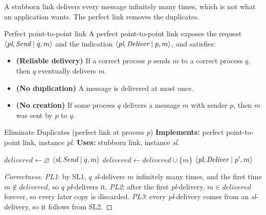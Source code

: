 A stubborn link delivers every message infinitely many times, which is not what an application wants. The perfect link removes the duplicates.

\begin{frameddefn}[label={def:perfect-link}]{Perfect point-to-point link}
  A perfect point-to-point link exposes the request $\left\langle \textit{pl}, \textit{Send} \mid q, m \right\rangle$ and the indication $\left\langle \textit{pl}, \textit{Deliver} \mid p, m \right\rangle$, and satisfies:
  \begin{itemize}[leftmargin=3.4em]
    \item[\textbf{PL1}] \textbf{(Reliable delivery)} If a correct process $p$ sends $m$ to a correct process $q$, then $q$ eventually delivers $m$.
    \item[\textbf{PL2}] \textbf{(No duplication)} A message is delivered at most once.
    \item[\textbf{PL3}] \textbf{(No creation)} If some process $q$ delivers a message $m$ with sender $p$, then $m$ was sent by $p$ to $q$.
  \end{itemize}
\end{frameddefn}

\begin{framedalgo}[label={alg:eliminate-duplicates}, unbreakable]{Eliminate Duplicates (perfect link at process $p$)}
  \textbf{Implements:} perfect point-to-point link, instance \textit{pl}. \quad \textbf{Uses:} stubborn link, instance \textit{sl}.
  \begin{algorithmic}[1]
      \State $\textit{delivered} \gets \varnothing$
    \EndUpon
      \State \Trigger $\left\langle \textit{sl}, \textit{Send} \mid q, m \right\rangle$
    \EndUpon
        \State $\textit{delivered} \gets \textit{delivered} \cup \{m\}$
        \State \Trigger $\left\langle \textit{pl}, \textit{Deliver} \mid p', m \right\rangle$
      \EndIf
    \EndUpon
  \end{algorithmic}
\end{framedalgo}

\begin{proof}[Correctness]
  \textit{PL1}: by SL1, $q$ \textit{sl}-delivers $m$ infinitely many times, and the first time $m \notin \textit{delivered}$, so $q$ \textit{pl}-delivers it. \textit{PL2}: after the first \textit{pl}-delivery, $m \in \textit{delivered}$ forever, so every later copy is discarded. \textit{PL3}: every \textit{pl}-delivery comes from an \textit{sl}-delivery, so it follows from SL2.
\end{proof}


